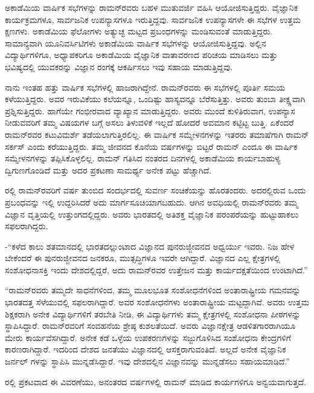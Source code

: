ಅಕಾಡೆಮಿಯ ವಾರ್ಷಿಕ ಸಭೆಗಳನ್ನು ರಾಮನ್‍ರವರು ಬಹಳ ಮುತುವರ್ಜಿ ವಹಿಸಿ ಆಯೋಜಿಸುತ್ತಿದ್ದರು. ವೈಜ್ಞಾನಿಕ ಕಾರ್ಯಕ್ರಮಗಳೂ, ಸಾರ್ವಜನಿಕ ಉಪನ್ಯಾಸಗಳೂ ಇರುತ್ತಿದ್ದವು. ಸಾರ್ವಜನಿಕ ಉಪನ್ಯಾಸಗಳೇ ಈ ಸಭೆಗಳ ಉತ್ತಮ ಕ್ಷಣಗಳು. ಅಕಾಡೆಮಿಯ ಫೆಲೋಗಳು ಅತ್ಯುಚ್ಛ ಮಟ್ಟದ ಪ್ರಬಂಧಗಳನ್ನು ಮಂಡಿಸುವಂತೆ ಮಾಡುತ್ತಿದ್ದರು. ಸಾಮಾನ್ಯವಾಗಿ ಯೂನಿವರ್ಸಿಟಿಗಳು ಅಕಾಡೆಮಿಯ ವಾರ್ಷಿಕ ಸಭೆಗಳನ್ನು ಆಯೋಜಿಸುತ್ತಿದ್ದವು. ಅಲ್ಲಿನ ವಿದ್ಯಾರ್ಥಿಗಳಿಗೂ, ಅಧ್ಯಾಪಕರಿಗೂ ಅಕಾಡೆಮಿಯ ವೈಜ್ಞಾನಿಕ ವಾತಾವರಣದ ಪರಿಚಯ ಮಾಡಿಸಲು ಮತ್ತು ಭವಿಷ್ಯದಲ್ಲಿ ಯುವಕರನ್ನು ವಿಜ್ಞಾನ ರಂಗಕ್ಕೆ ಆಕರ್ಷಿಸಲು ಇವು ಸಹಾಯ ಮಾಡುತ್ತಿದ್ದವು.

ನಾನು ಇಂತಹ ಹತ್ತು ವಾರ್ಷಿಕ ಸಭೆಗಳಲ್ಲಿ ಹಾಜರಾಗಿದ್ದೇನೆ. ರಾಮನ್‍ರವರು ಈ ಸಭೆಗಳಲ್ಲಿ ಪೂರ್ತಿ ಸಮಯ ಕಳೆಯುತ್ತಿದ್ದರು. ಅವರ ಇರುವಿಕೆಯು ಕಲೆಯನ್ನೂ, ಒಂದಿಷ್ಟು ಹಾಸ್ಯವನ್ನೂ ಬೆರೆಸುತ್ತಿತ್ತು. ಅವರು ತುಂಬಾ ತೀಕ್ಷ್ಣವಾಗಿ ಪ್ರಶ್ನಿಸುತ್ತಿದ್ದರು. ಹಾಗೆಯೇ ಗಂಭೀರವಾದ ವ್ಯಾಖ್ಯಾನ ಮಾಡುತ್ತಿದ್ದರು. ಅವರು ಮುಂದೆ ಕುಳಿತಿರುವಾಗ, ಉಪನ್ಯಾಸ ನೀಡುವವರಿಗೆ ತಮ್ಮ ವಿಷಯಗಳ ಬಗ್ಗೆ ಅಸಲು ತಿಳುವಳಿಕೆ ಇಲ್ಲದೆ ಹೋದರೆ ಅವಮಾನ ಕಟ್ಟಿಟ್ಟ ಬುತ್ತಿ. ಏಕೆಂದರೆ ರಾಮನ್‍ರವರ ಕಟುವಿಮರ್ಶೆ ತಡೆಯಲಾಗುತ್ತಿರಲಿಲ್ಲ. ಈ ವಾರ್ಷಿಕ ಸಮ್ಮೇಳನಗಳನ್ನು ಇತರರು ತಮಾಷೆಗಾಗಿ ರಾಮನ್ ಸರ್ಕಸ್ ಎಂದು ಕರೆಯುತ್ತಿದ್ದರು. ತಮ್ಮ ಜೀವನದ ಕೊನೆಯ ವರ್ಷಗಳನ್ನು ಬಿಟ್ಟರೆ ರಾಮನ್ ಎಂದೂ ಈ ವಾರ್ಷಿಕ ಸಮ್ಮೇಳನಗಳನ್ನು ತಪ್ಪಿಸಿಕೊಳ್ಳಲಿಲ್ಲ. ರಾಮನ್ ಗತಿಸಿದ ನಂತರದ ದಿನಗಳಲ್ಲಿ ಅಕಾಡೆಮಿಯ ಕಾರ್ಯಬಾಹುಳ್ಯ ದ್ವಿಗುಣಗೊಂಡಿದೆ ಮತ್ತು ಅದರ ಪ್ರಕಟಣಾ ಸಾಮರ್ಥ್ಯ ಅನೇಕ ಪಟ್ಟು ಹೆಚ್ಚಾಗಿದೆ.

ರಲ್ಲಿ ರಾಮನ್‍ರವರಿಗೆ  ವರ್ಷ ತುಂಬಿದ ಸಂದರ್ಭದಲ್ಲಿ ಸುವರ್ಣ ಸಂಚಿಕೆಯನ್ನು ಹೊರತಂದರು. ಅದರಲ್ಲಿರುವ ಒಂದು ಪ್ರಬಂಧವನ್ನು ಇಲ್ಲಿ ಉದ್ದರಿಸಿದರೆ ಅದು ಮಾರ್ಗಸೂಚಿಯಾಗಬಹುದು. ಆಗಿನ ಅವಧಿಯಲ್ಲಿ ರಾಮನ್‍ರವರು ತಮ್ಮ ವಿಜ್ಞಾನ ವೃತ್ತಿಯಲ್ಲಿ ಉತ್ತುಂಗದಲ್ಲಿದ್ದರು. ಅವರು ಭಾರತದಲ್ಲಿ ಅತಿಶಕ್ತ ವೈಜ್ಞಾನಿಕ ಪರಂಪರೆಯನ್ನು ಹುಟ್ಟುಹಾಕಲು ಸಫಲರಾಗಿದ್ದರು.

-“ಕಳೆದ ಕಾಲು ಶತಮಾನದಲ್ಲಿ ಭಾರತದಲ್ಲುಂಟಾದ ವಿಜ್ಞಾನದ ಪುನರುಜ್ಜೀವನದ ಅಧ್ವರ್ಯು ಇವರು. ನಿಜ ಹೇಳ ಬೇಕೆಂದರೆ ಈ ಪುನರುಜ್ಜೀವನದ ಜನಕರೂ, ಮುತ್ಸದ್ಧಿಗಳೂ ಇವರೇ ಆಗಿದ್ದಾರೆ. ವಿಜ್ಞಾನದ ಎಲ್ಲ ಕ್ಷೇತ್ರಗಳಲ್ಲಿ ಸಂಶೋಧನಾಸಕ್ತಿ ಇಂದು ದೇಶದಲ್ಲಿದ್ದರೆ, ಅದು ರಾಮನ್‍ರವರ ಉತ್ತೇಜನ ಮತ್ತು ಕಾರ್ಯದಕ್ಷತೆಯಿಂದ ಉಂಟಾಗಿದೆ.”

“ರಾಮನ್‍ರವರು ತಮ್ಮದೇ ಸಾಧನೆಗಳಿಂದ, ತಮ್ಮ ಮೂಲಭೂತ ಸಂಶೋಧನೆಗಳಿಂದ ಅಂತಾರಾಷ್ಟ್ರೀಯ ಗಮನವನ್ನು ಭಾರತದತ್ತ ಸೆಳೆಯುವಲ್ಲಿ ಸಫಲರಾಗಿದ್ದಾರೆ. ಅವರ ಸಂಶೋಧನೆಗಳು ಅಂತಾರಾಷ್ಟ್ರೀಯ ಮಟ್ಟದ್ದಾಗಿವೆ. ಅವರು ಉತ್ತಮ ಶಿಕ್ಷಕರಾಗಿ ಅನೇಕ ವಿದ್ಯಾರ್ಥಿಗಳಿಗೆ ತರಬೇತಿ ನೀಡಿ, ಈ ವಿದ್ಯಾರ್ಥಿಗಳು ತಮ್ಮ ಕ್ಷೇತ್ರಗಳಲ್ಲಿ ಸಂಶೋಧನಾ ಪೀಠಗಳನ್ನು ಸ್ಥಾಪಿಸಿದ್ದಾರೆ. ರಾಮನ್‍ರವರಿಗೆ ಸಂವಹನೆಯ ಶ್ರೇಷ್ಠ ಕುಶಲತೆಯಿದೆ. ಅವರು ವಿಜ್ಞಾನಕ್ಷೇತ್ರ ಆಡಳಿತಗಾರರಾಗಿಯೂ ಮೇರು ಕಾರ್ಯವೆಸಗಿದ್ದಾರೆ. ಅನೇಕ ಕಡೆ ಒಳ್ಳೆಯ ಉಪಕರಣಗಳನ್ನು ಸಜ್ಜುಗೊಳಿಸಿದ ಸಂಶೋಧನಾ ಕೇಂದ್ರಗಳಿಗೆ ಕಾರಣರಾಗಿದ್ದಾರೆ. ಇದರಿಂದ ದೇಶದ ಜನತೆಯು ವಿಜ್ಞಾನದಲ್ಲಿ ಆಸಕ್ತರಾಗುವಂತಿದೆ. ಅಲ್ಲದೆ ಅನೇಕ ವೈಜ್ಞಾನಿಕ ಜರ್ನಲ್ ಗಳನ್ನು ಸ್ಥಾಪಿಸಿ ಮುನ್ನಡೆಸಿದ್ದಾರೆ. ಇವು ದೇಶದಲ್ಲಿನ ವಿಜ್ಞಾನವನ್ನು ಮುನ್ನಡೆಸಲು ಸಹಾಯಮಾಡಿದೆ.”

ರಲ್ಲಿ ಪ್ರಕಟವಾದ ಈ ವಿವರಣೆಯು, ಅನಂತರದ ವರ್ಷಗಳಲ್ಲಿ ರಾಮನ್ ಮಾಡಿದ ಕಾರ್ಯಗಳಿಗೂ ಅನ್ವಯವಾಗುತ್ತದೆ.

